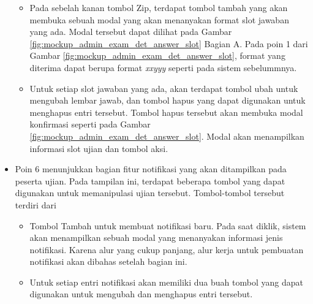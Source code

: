 \begin{itemize}
\begin{itemize}
                \item Pada sebelah kanan tombol Zip, terdapat tombol tambah yang
                    akan membuka sebuah modal yang akan menanyakan format slot
                    jawaban yang ada. Modal tersebut dapat dilihat pada Gambar
                    \ref{fig:mockup_admin_exam_det_answer_slot} Bagian A. Pada
                    poin 1 dari Gambar
                    \ref{fig:mockup_admin_exam_det_answer_slot}, format yang
                    diterima dapat berupa format \textit{xxyyy} seperti pada
                    sistem sebelummnya.
                    
                \item Untuk setiap slot jawaban yang ada, akan terdapat tombol
                    ubah untuk mengubah lembar jawab, dan tombol hapus yang
                    dapat digunakan untuk menghapus entri tersebut. Tombol hapus
                    tersebut akan membuka modal konfirmasi seperti pada Gambar
                    \ref{fig:mockup_admin_exam_det_answer_slot}. Modal akan
                    menampilkan informasi slot ujian dan tombol aksi.
            \end{itemize}
            
        \item Poin 6 menunjukkan bagian fitur notifikasi yang akan ditampilkan
            pada peserta ujian. Pada tampilan ini, terdapat beberapa tombol yang
            dapat digunakan untuk memanipulasi ujian tersebut. Tombol-tombol
            tersebut terdiri dari
                \begin{itemize}
                    \item Tombol Tambah untuk membuat notifikasi baru. Pada saat
                        diklik, sistem akan menampilkan sebuah modal yang
                        menanyakan informasi jenis notifikasi. Karena alur yang
                        cukup panjang, alur kerja untuk pembuatan notifikasi
                        akan dibahas setelah bagian ini.
                        
                    \item Untuk setiap entri notifikasi akan memiliki dua buah
                        tombol yang dapat digunakan untuk mengubah dan menghapus
                        entri tersebut.
                \end{itemize}
            

\end{itemize}
